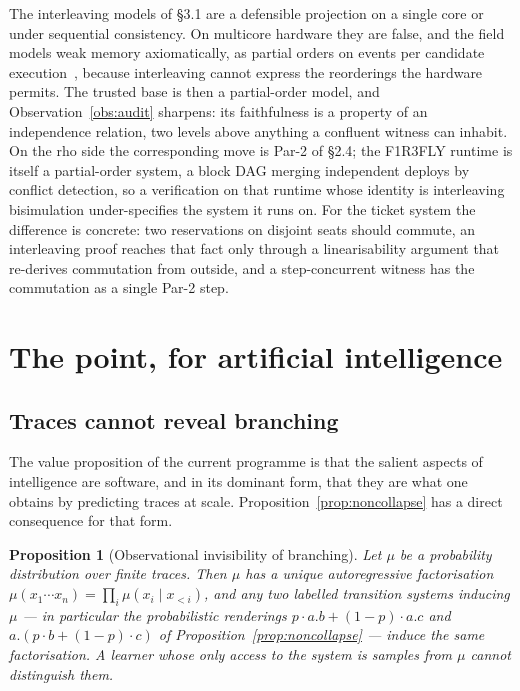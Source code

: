 \documentclass[11pt]{article}
\theoremstyle{plain}
\newtheorem{proposition}[theorem]{Proposition}
\theoremstyle{definition}
\theoremstyle{remark}
\begin{document}
The interleaving models of \S3.1 are a defensible projection on a single core
or under sequential consistency. On multicore hardware they are false, and the
field models weak memory axiomatically, as partial orders on events per
candidate execution~\cite{Herd}, because interleaving cannot express the
reorderings the hardware permits. The trusted base is then a partial-order
model, and Observation~\ref{obs:audit} sharpens: its faithfulness is a property
of an independence relation, two levels above anything a confluent witness can
inhabit. On the rho side the corresponding move is Par-2 of \S2.4; the
F1R3FLY runtime is itself a partial-order system, a block DAG merging
independent deploys by conflict detection, so a verification on that runtime
whose identity is interleaving bisimulation under-specifies the system it runs
on. For the ticket system the difference is concrete: two reservations on
disjoint seats should commute, an interleaving proof reaches that fact only
through a linearisability argument that re-derives commutation from outside,
and a step-concurrent witness has the commutation as a single Par-2 step.

\section{The point, for artificial intelligence}\label{sec:ai}

\subsection{Traces cannot reveal branching}

The value proposition of the current programme is that the salient aspects of
intelligence are software, and in its dominant form, that they are what one
obtains by predicting traces at scale. Proposition~\ref{prop:noncollapse}
has a direct consequence for that form.

\begin{proposition}[Observational invisibility of branching]\label{prop:invisible}
Let $\mu$ be a probability distribution over finite traces. Then $\mu$ has a
unique autoregressive factorisation $\mu(x_1\cdots x_n) = \prod_i
\mu(x_i \mid x_{<i})$, and any two labelled transition systems inducing $\mu$
--- in particular the probabilistic renderings
$p\cdot a.b + (1-p)\cdot a.c$ and $a.(p\cdot b + (1-p)\cdot c)$ of
Proposition~\ref{prop:noncollapse} --- induce the same factorisation. A
learner whose only access to the system is samples from $\mu$ cannot
distinguish them.
\end{proposition}
\end{document}
